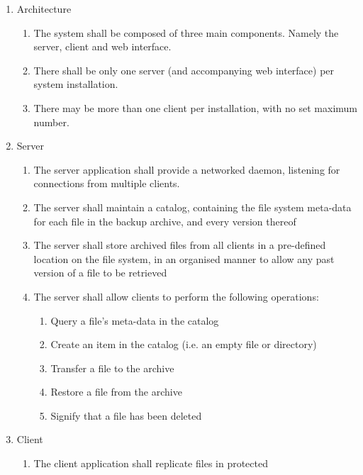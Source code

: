 \begin{enumerate}
    \item Architecture
        \begin{enumerate}
            \item The system shall be composed of three main components.
                Namely the server, client and web interface.
            \item There shall be only one server (and accompanying web
                interface) per system installation.
            \item There may be more than one client per installation, with no
                set maximum number.
        \end{enumerate}
    \item Server
        \begin{enumerate}
            \item The server application shall provide a networked daemon,
                listening for connections from multiple clients.
            \item The server shall maintain a catalog, containing the file
                system meta-data for each file in the backup archive, and every
                version thereof
            \item The server shall store archived files from all clients in
                a pre-defined location on the file system, in an organised
                manner to allow any past version of a file to be retrieved
            \item The server shall allow clients to perform the following
                operations:
                \begin{enumerate}
                    \item Query a file's meta-data in the catalog
                    \item Create an item in the catalog (i.e. an empty file or
                        directory)
                    \item Transfer a file to the archive
                    \item Restore a file from the archive
                    \item Signify that a file has been deleted
                \end{enumerate}
        \end{enumerate}
    \item Client
        \begin{enumerate}
            \item The client application shall replicate files in protected

\end{enumerate}
\end{enumerate}
